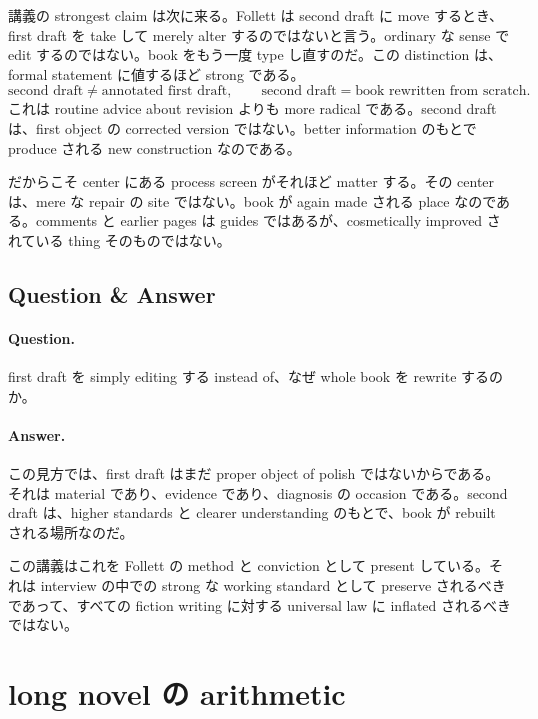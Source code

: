 講義の strongest claim は次に来る。Follett は second draft に move するとき、first draft を take して merely alter するのではないと言う。ordinary な sense で edit するのではない。book をもう一度 type し直すのだ。この distinction は、formal statement に値するほど strong である。
\begin{equation}
\text{second draft} \neq \text{annotated first draft}, \qquad
\text{second draft} = \text{book rewritten from scratch}.
\end{equation}
これは routine advice about revision よりも more radical である。second draft は、first object の corrected version ではない。better information のもとで produce される new construction なのである。

だからこそ center にある process screen がそれほど matter する。その center は、mere な repair の site ではない。book が again made される place なのである。comments と earlier pages は guides ではあるが、cosmetically improved されている thing そのものではない。

\subsection{Question \& Answer}

\paragraph{Question.} first draft を simply editing する instead of、なぜ whole book を rewrite するのか。

\paragraph{Answer.} この見方では、first draft はまだ proper object of polish ではないからである。それは material であり、evidence であり、diagnosis の occasion である。second draft は、higher standards と clearer understanding のもとで、book が rebuilt される場所なのだ。

\begin{remark}
この講義はこれを Follett の method と conviction として present している。それは interview の中での strong な working standard として preserve されるべきであって、すべての fiction writing に対する universal law に inflated されるべきではない。
\end{remark}

\section{long novel の arithmetic}

